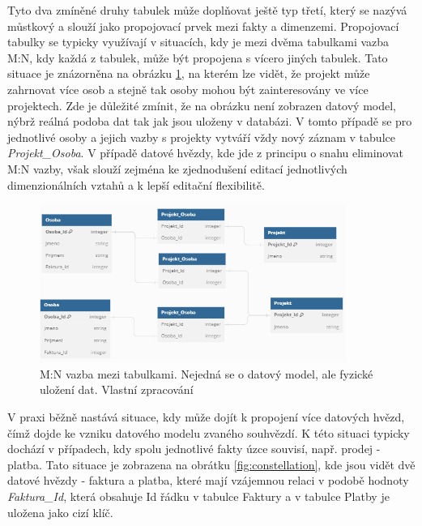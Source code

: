 \documentclass[
  digital,     %
  twoside,     %
  lof,         %
  lot,         %
]{fithesis4}
\begin{document}
Tyto dva zmíněné druhy tabulek může doplňovat ještě typ třetí, který se nazývá můstkový a slouží jako propojovací prvek mezi fakty a dimenzemi. Propojovací tabulky se typicky využívají v situacích, kdy je mezi dvěma tabulkami vazba M:N, kdy každá z tabulek, může být propojena s vícero jiných tabulek. Tato situace je znázorněna na  
obrázku \ref{fig:M_N}, na kterém lze vidět, že projekt může zahrnovat více osob a stejně tak osoby mohou být zainteresovány ve více projektech. Zde je důležité zmínit, že na obrázku není zobrazen datový model, nýbrž reálná podoba dat tak jak jsou uloženy v databázi. V tomto případě se pro jednotlivé osoby a jejich vazby s projekty vytváří vždy nový záznam v tabulce \emph{Projekt\_Osoba}. V případě datové hvězdy, kde jde z principu o snahu eliminovat M:N vazby, však slouží zejména ke zjednodušení editací jednotlivých dimenzionálních vztahů a k lepší editační flexibilitě. 
\begin{figure}[h]
  \begin{center}
          \includegraphics[width=10cm]{img/M_N.png}
  \end{center}
  \caption{M:N vazba mezi tabulkami. Nejedná se o datový model, ale fyzické uložení dat.  Vlastní zpracování}
  \label{fig:M_N}
\end{figure}  

V praxi běžně nastává situace, kdy může dojít k propojení více datových hvězd, čímž dojde ke vzniku datového modelu zvaného souhvězdí. K této situaci typicky dochází v případech, kdy spolu jednotlivé fakty úzce souvisí, např. prodej - platba. Tato situace je zobrazena na obrátku \ref{fig:constellation}, kde jsou vidět dvě datové hvězdy - faktura a platba, které mají vzájemnou relaci v podobě hodnoty \emph{Faktura\_Id}, která obsahuje Id řádku v tabulce Faktury a v tabulce Platby je uložena jako cizí klíč.
\end{document}
